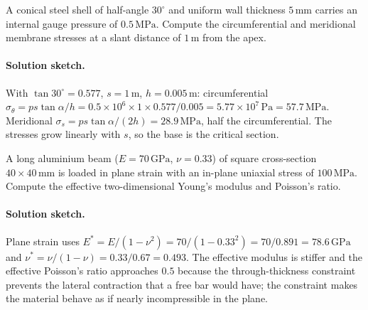 \begin{exercise}
A conical steel shell of half-angle $30^{\circ}$ and uniform wall
thickness $5\,\si{\milli\meter}$ carries an internal gauge pressure
of $0.5\,\text{MPa}$. Compute the circumferential and meridional
membrane stresses at a slant distance of $1\,\si{\meter}$ from
the apex.

\paragraph{Solution sketch.} With $\tan 30^\circ = 0.577$, $s = 1\,
\si{\meter}$, $h = 0.005\,\si{\meter}$: circumferential $\sigma_\theta
= p s\tan\alpha/h = 0.5\times 10^6\times 1\times 0.577/0.005 = 5.77
\times 10^7\,\text{Pa} = 57.7\,\text{MPa}$. Meridional $\sigma_s =
p s\tan\alpha/(2h) = 28.9\,\text{MPa}$, half the circumferential. The
stresses grow linearly with $s$, so the base is the critical section.
\end{exercise}

\begin{exercise}
A long aluminium beam ($E = 70\,\text{GPa}$, $\nu = 0.33$) of
square cross-section $40 \times 40\,\si{\milli\meter}$ is loaded
in plane strain with an in-plane uniaxial stress of $100\,\text{MPa}
$. Compute the effective two-dimensional Young's modulus and
Poisson's ratio.

\paragraph{Solution sketch.} Plane strain uses $E^* = E/(1-\nu^2) =
70/(1-0.33^2) = 70/0.891 = 78.6\,\text{GPa}$ and $\nu^* = \nu/(1-\nu)
= 0.33/0.67 = 0.493$. The effective modulus is stiffer and the
effective Poisson's ratio approaches $0.5$ because the through-thickness
constraint prevents the lateral contraction that a free bar would
have; the constraint makes the material behave as if nearly
incompressible in the plane.
\end{exercise}

